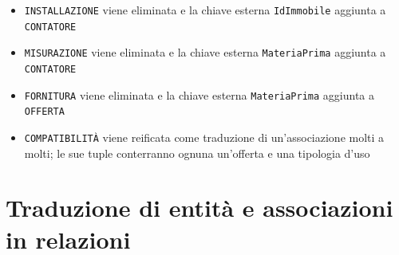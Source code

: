 \documentclass[a4paper,12pt]{report}
\begin{document}
\begin{itemize}
    \item \texttt{INSTALLAZIONE} viene eliminata e la chiave esterna \texttt{IdImmobile} aggiunta a \texttt{CONTATORE}
    \item \texttt{MISURAZIONE} viene eliminata e la chiave esterna \texttt{MateriaPrima} aggiunta a \texttt{CONTATORE}
    \item \texttt{FORNITURA} viene eliminata e la chiave esterna \texttt{MateriaPrima} aggiunta a \texttt{OFFERTA}
    \item \texttt{COMPATIBILITÀ} viene reificata come traduzione di un'associazione molti a molti; le sue tuple conterranno ognuna un'offerta e una tipologia d'uso
\end{itemize}

\section{Traduzione di entità e associazioni in relazioni}
\end{document}
